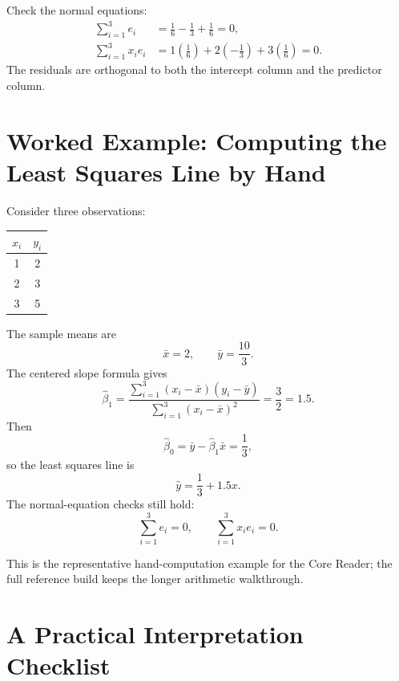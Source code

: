 {Check the normal equations:
\begin{align}
  \sum_{i=1}^3 e_i&=\frac{1}{6}-\frac{1}{3}+\frac{1}{6}=0, \\
  \sum_{i=1}^3 x_i e_i&=1\left(\frac{1}{6}\right)+2\left(-\frac{1}{3}\right)+3\left(\frac{1}{6}\right)=0.
\end{align}
The residuals are orthogonal to both the intercept column and the predictor column.
}{
\section{Worked Example: Computing the Least Squares Line by Hand}

Consider three observations:
\begin{center}
\begin{tabular}{cc}
\hline
$x_i$ & $y_i$ \\
\hline
1 & 2 \\
2 & 3 \\
3 & 5 \\
\hline
\end{tabular}
\end{center}

The sample means are
\begin{equation}
  \bar{x}=2,
  \qquad
  \bar{y}=\frac{10}{3}.
\end{equation}
The centered slope formula gives
\begin{equation}
  \widehat{\beta}_1
  =\frac{\sum_{i=1}^3(x_i-\bar{x})(y_i-\bar{y})}{\sum_{i=1}^3(x_i-\bar{x})^2}
  =\frac{3}{2}=1.5.
\end{equation}
Then
\begin{equation}
  \widehat{\beta}_0=\bar{y}-\widehat{\beta}_1\bar{x}=\frac{1}{3},
\end{equation}
so the least squares line is
\begin{equation}
  \widehat{y}=\frac{1}{3}+1.5x.
\end{equation}
The normal-equation checks still hold:
\begin{equation}
  \sum_{i=1}^3 e_i=0,
  \qquad
  \sum_{i=1}^3 x_i e_i=0.
\end{equation}

This is the representative hand-computation example for the Core Reader; the full reference build keeps the longer arithmetic walkthrough.
}

\section{A Practical Interpretation Checklist}

